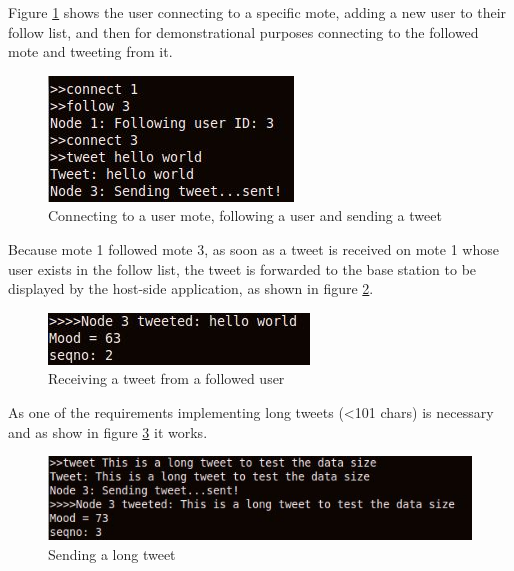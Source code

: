 \documentclass{article}
\begin{document}
Figure \ref{fig:tweeting} shows the user connecting to a specific mote, adding a new user to their follow list, and then for demonstrational purposes connecting to the followed mote and tweeting from it.
\begin{figure}[htb!]
\centering
\includegraphics[scale=.6]{img/tweet.jpg}
\caption{Connecting to a user mote, following a user and sending a tweet}
\label{fig:tweeting}
\end{figure}

Because mote 1 followed mote 3, as soon as a tweet is received on mote 1 whose user exists in the follow list, the tweet is forwarded to the base station to be displayed by the host-side application, as shown in figure \ref{fig:receive}.
\begin{figure}[htb!]
\centering
\includegraphics[scale=.7]{img/receive.jpg}
\caption{Receiving a tweet from a followed user}
\label{fig:receive}
\end{figure}

\newpage
As one of the requirements implementing long tweets (\textless101 chars) is necessary and as show in figure \ref{fig:long} it works.
\begin{figure}[htb!]
\centering
\includegraphics[scale=.50]{img/long.jpg}
\caption{Sending a long tweet}
\label{fig:long}
\end{figure}
\end{document}
